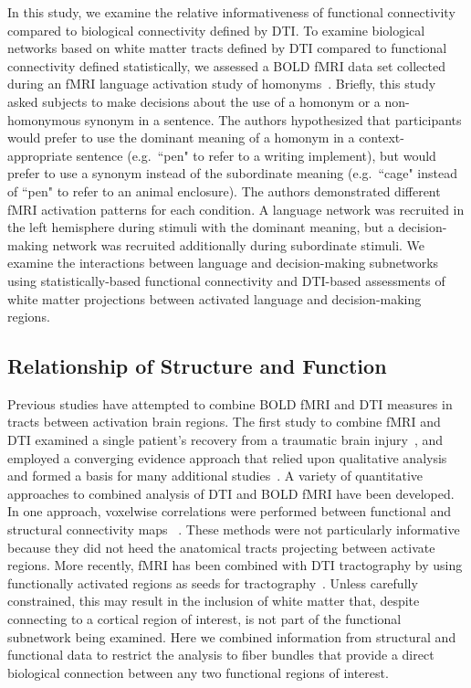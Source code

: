 In this study, we examine the relative informativeness of functional connectivity compared to biological connectivity defined by DTI. To examine biological networks based on white matter tracts defined by DTI compared to functional connectivity defined statistically, we assessed a BOLD fMRI data set collected during an fMRI language activation study of homonyms~\cite{McMillan2010}. Briefly, this study asked subjects to make decisions about the use of a homonym or a non-homonymous synonym in a sentence. The authors hypothesized that participants would prefer to use the dominant meaning of a homonym in a context-appropriate sentence (e.g.\ ``pen" to refer to a writing implement), but would prefer to use a synonym instead of the subordinate meaning (e.g.\ ``cage" instead of ``pen" to refer to an animal enclosure). The authors demonstrated different fMRI activation patterns for each condition. A language network was recruited in the left hemisphere during stimuli with the dominant meaning, but a decision-making network was recruited additionally during subordinate stimuli. We examine the interactions between language and decision-making subnetworks using statistically-based functional connectivity and DTI-based assessments of white matter projections between activated language and decision-making regions.

\subsection{Relationship of Structure and Function}
Previous studies have attempted to combine BOLD fMRI and DTI measures in tracts between activation brain regions.
The first study to combine fMRI and DTI examined a single patient's recovery from a traumatic brain injury~\cite{Werring1998a}, and employed a converging evidence approach that relied upon qualitative analysis and formed a basis for many additional studies~\cite{Werring1999b,Jang2005,Klein2007,Munakata2006,Shinoura2006,Koch2002a}. A variety of quantitative approaches to combined analysis of DTI and BOLD fMRI have been developed. In one approach, voxelwise correlations were performed between functional and structural connectivity maps ~\cite{Olesen2003,Thomas2009}. These methods were not particularly informative because they did not heed the anatomical tracts projecting between activate regions. More recently, fMRI has been combined with DTI tractography by using functionally activated regions as seeds for tractography~\cite{Toosy2004,Powell2006,Upadhyay2007,Boorman2007,Jenkins2010}. Unless carefully constrained, this may result in the inclusion of white matter that, despite connecting to a cortical region of interest, is not part of the functional subnetwork being examined. Here we combined information from structural and functional data to restrict the analysis to fiber bundles that provide a direct biological connection between any two functional regions of interest. 

